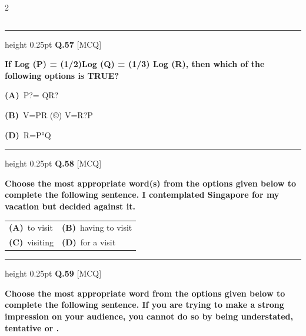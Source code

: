 \documentclass[a4paper,10pt,twoside]{article}
\begin{document}
\begin{multicols}{2}
\begin{tabular*}{\columnwidth}{@{\extracolsep{\fill}}p{}p{}@{}}
\end{tabular*}
\par\vspace{6pt}\hrule height 0.25pt\vspace{6pt}
\noindent\textbf{Q.57} \hfill {\footnotesize\textsf{[MCQ]}}
\par\vspace{2pt}
{\bfseries If Log (P) = (1/2)Log (Q) = (1/3) Log (R), then which of the following options is TRUE? \par}
\par\vspace{2pt}\noindent
\textbf{(A)}~P?= QR?\par\vspace{2pt}\noindent
\textbf{(B)}~V=PR (©) V=R?P\par\vspace{2pt}\noindent
\textbf{(D)}~R=P°Q
\par\vspace{6pt}\hrule height 0.25pt\vspace{6pt}
\noindent\textbf{Q.58} \hfill {\footnotesize\textsf{[MCQ]}}
\par\vspace{2pt}
{\bfseries Choose the most appropriate word(s) from the options given below to complete the following
sentence.
I contemplated Singapore for my vacation but decided against it. \par}
\par\vspace{2pt}\noindent
\begin{tabular*}{\columnwidth}{@{\extracolsep{\fill}}p{}p{}@{}}
\textbf{(A)}~to visit & \textbf{(B)}~having to visit \\
\addlinespace[2pt]
\textbf{(C)}~visiting & \textbf{(D)}~for a visit
\end{tabular*}
\par\vspace{6pt}\hrule height 0.25pt\vspace{6pt}
\noindent\textbf{Q.59} \hfill {\footnotesize\textsf{[MCQ]}}
\par\vspace{2pt}
{\bfseries Choose the most appropriate word from the options given below to complete the following
sentence.
If you are trying to make a strong impression on your audience, you cannot do so by being
understated, tentative or . \par}
\par\vspace{2pt}\noindent

\end{multicols}
\end{document}
